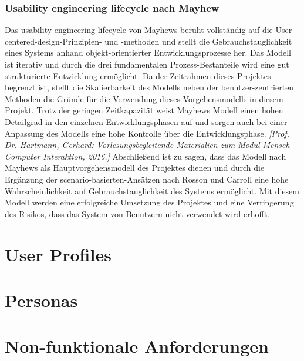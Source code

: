 \documentclass[a4paper,11pt]{article}%
\renewcommand{\\}{\vspace*{0.5\baselineskip} \newline}
\begin{document}
		\subsubsection{Usability engineering lifecycle nach Mayhew}
			Das usability engineering lifecycle von Mayhews beruht vollständig auf die User-centered-design-Prinzipien- und -methoden und stellt die Gebrauchstauglichkeit eines Systems anhand objekt-orientierter Entwicklungsprozesse her. Das Modell ist iterativ und durch die drei fundamentalen Prozess-Bestanteile wird eine gut strukturierte Entwicklung ermöglicht. Da der Zeitrahmen dieses Projektes begrenzt ist, stellt die Skalierbarkeit des Modells neben der benutzer-zentrierten Methoden die Gründe für die Verwendung dieses Vorgehensmodells in diesem Projekt. Trotz der geringen Zeitkapazität weist Mayhews Modell einen hohen Detailgrad in den einzelnen Entwicklungsphasen auf und sorgen auch bei einer Anpassung des Modells eine hohe Kontrolle über die Entwicklungsphase. \emph{[Prof. Dr. Hartmann, Gerhard: Vorlesungsbegleitende Materialien zum Modul Mensch-Computer Interaktion, 2016.]}\\
			Abschließend ist zu sagen, dass das Modell nach Mayhews als Hauptvorgehensmodell des Projektes dienen und durch die Ergänzung der scenario-basierten-Ansätzen nach Rosson und Carroll eine hohe Wahrscheinlichkeit auf Gebrauchstauglichkeit des Systems ermöglicht. Mit diesem Modell werden eine erfolgreiche Umsetzung des Projektes und eine Verringerung des Risikos, dass das System von Benutzern nicht verwendet wird erhofft.
\newpage
\section{User Profiles}
\label{section:Profiles}
\newpage
\section{Personas}
\label{section:Personas}
\newpage
\section{Non-funktionale Anforderungen}
\label{section:nfAnforderungen}
\end{document}
